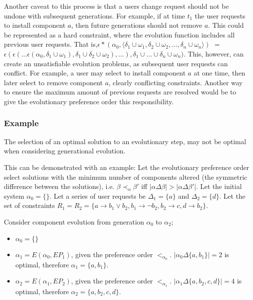 Another caveat to this process is that a users change request should not be undone with subsequent generations.
For example, if at time $t_1$ the user requests to install component $a$, then future generations should not remove $a$.
This could be represented as a hard constraint, where the evolution function includes all previous user requests.
That is,$\epsilon*(\alpha_0,\langle \delta_1 \cup \omega_1,\delta_2 \cup \omega_2,\ldots,\delta_{n} \cup \omega_n \rangle)$ $=$ $\epsilon(\epsilon(\ldots \epsilon(\alpha_0,\delta_1 \cup \omega_1),\delta_1 \cup \delta_2 \cup \omega_2 ),\ldots),\delta_1 \cup \ldots \cup \delta_n \cup \omega_n)$.
This, however, can create an unsatisfiable evolution problems, as subsequent user requests can conflict.
For example, a user may select to install component $a$ at one time, then later select to remove component $a$, clearly conflicting constraints.
Another way to ensure the maximum amount of previous requests are resolved would be to give the evolutionary preference order this responsibility.

\subsubsection{Example}
The selection of an optimal solution to an evolutionary step, may not be optimal when considering generational evolution.

This can be demonstrated with an example:
Let the evolutionary preference order select solutions with the minimum number of components altered (the symmetric difference between the solutions), 
i.e. $\beta \prec_{\alpha} \beta'$ iff $|\alpha \Delta \beta| > |\alpha \Delta \beta'|$.
Let the initial system $\alpha_0 = \{\}$.
Let a series of user requests be $\Delta_1 = \{a\}$ and $ \Delta_2 = \{d\}$. 
Let the set of constraints $R_1 = R_2 = \{a \rightarrow b_1 \vee b_2, b_1 \rightarrow \neg b_2, b_2 \rightarrow c, d \rightarrow b_2\}$.

Consider component evolution from generation $\alpha_0$ to $\alpha_2$;
\begin{itemize}
  \item $\alpha_0 = \{\}$
  \item $\alpha_1 = E(\alpha_0,EP_1)$, given the preference order $<_{\alpha_0}$. $|\alpha_0 \Delta \{a,b_1\}| = 2$ is optimal, therefore $\alpha_1 = \{a,b_1\}$.
  \item $\alpha_2 = E(\alpha_1,EP_2)$, given the preference order $<_{\alpha_1}$. $|\alpha_1 \Delta \{a,b_2,c,d\}| = 4$ is optimal, therefore $\alpha_2 = \{a,b_2,c,d\}$.
\end{itemize}

